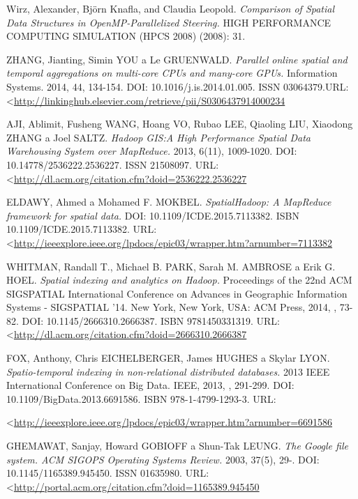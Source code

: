 \documentclass[a4paper,12pt,oneside]{report}
\begin{document}
\begin{thebibliography}{99}
		Wirz, Alexander, Björn Knafla, and Claudia Leopold. \textit{Comparison of
			Spatial Data Structures in OpenMP-Parallelized Steering.} HIGH PERFORMANCE
		COMPUTING  SIMULATION (HPCS 2008) (2008): 31.
		
		ZHANG, Jianting, Simin YOU a Le GRUENWALD. \textit{Parallel online spatial and
			temporal aggregations on multi-core CPUs and many-core GPUs.} Information
		Systems. 2014, 44, 134-154. DOI: 10.1016/j.is.2014.01.005. ISSN 03064379.URL: 
		\textless\url{http://linkinghub.elsevier.com/retrieve/pii/S0306437914000234}
		
		
		AJI, Ablimit, Fusheng WANG, Hoang VO, Rubao LEE, Qiaoling LIU, Xiaodong ZHANG
a
		Joel SALTZ. \textit{Hadoop GIS:A High Performance Spatial Data Warehousing
			System over MapReduce.} 2013, 6(11), 1009-1020. DOI:
10.14778/2536222.2536227.
		ISSN 21508097.  URL: 
		\textless\url{http://dl.acm.org/citation.cfm?doid=2536222.2536227}
		
		ELDAWY, Ahmed a Mohamed F. MOKBEL. \textit{SpatialHadoop: A MapReduce
framework
			for spatial data.} DOI: 10.1109/ICDE.2015.7113382. ISBN
		10.1109/ICDE.2015.7113382. URL: 
\textless\url{http://ieeexplore.ieee.org/lpdocs/epic03/wrapper.htm?arnumber=7113382}
		
		WHITMAN, Randall T., Michael B. PARK, Sarah M. AMBROSE a Erik G. HOEL.
		\textit{Spatial indexing and analytics on Hadoop.} Proceedings of the 22nd ACM
		SIGSPATIAL International Conference on Advances in Geographic Information
		Systems - SIGSPATIAL '14. New York, New York, USA: ACM Press, 2014, , 73-82.
		DOI: 10.1145/2666310.2666387. ISBN 9781450331319. URL: 
		\textless\url{http://dl.acm.org/citation.cfm?doid=2666310.2666387}
		
		FOX, Anthony, Chris EICHELBERGER, James HUGHES a Skylar LYON.
		\textit{Spatio-temporal indexing in non-relational distributed databases.}
2013
		IEEE International Conference on Big Data. IEEE, 2013, , 291-299. DOI:
		10.1109/BigData.2013.6691586. ISBN 978-1-4799-1293-3. URL: 
	
\textless\url{http://ieeexplore.ieee.org/lpdocs/epic03/wrapper.htm?arnumber=6691586}
		
		GHEMAWAT, Sanjay, Howard GOBIOFF a Shun-Tak LEUNG. \textit{The Google file
			system. ACM SIGOPS Operating Systems Review.} 2003, 37(5), 29-. DOI:
		10.1145/1165389.945450. ISSN 01635980.  URL: 
		\textless\url{http://portal.acm.org/citation.cfm?doid=1165389.945450}
		

\end{thebibliography}
\end{document}

